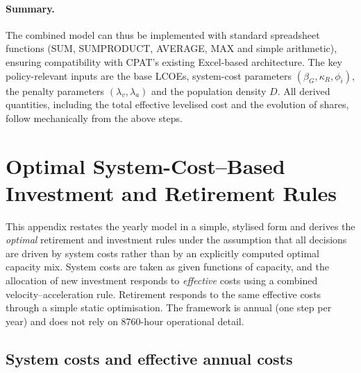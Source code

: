 \documentclass[preprint,authoryear,12pt]{elsarticle}
\begin{document}
\paragraph{Summary.}

The combined model can thus be implemented with standard spreadsheet functions (SUM,
SUMPRODUCT, AVERAGE, MAX and simple arithmetic), ensuring compatibility with CPAT’s
existing Excel-based architecture. The key policy-relevant inputs are the base LCOEs,
system-cost parameters $(\beta_G,\kappa_R,\phi_i)$, the penalty parameters $(\lambda_v,
\lambda_a)$ and the population density $D$. All derived quantities, including the total effective
levelised cost and the evolution of shares, follow mechanically from the above steps.


\newpage


\section{Optimal System-Cost–Based Investment and Retirement Rules}

This appendix restates the yearly model in a simple, stylised form and derives the \emph{optimal}
retirement and investment rules under the assumption that all decisions are driven by system
costs rather than by an explicitly computed optimal capacity mix. System costs are taken as
given functions of capacity, and the allocation of new investment responds to \emph{effective}
costs using a combined velocity–acceleration rule. Retirement responds to the same effective
costs through a simple static optimisation. The framework is annual (one step per year) and does
not rely on 8760-hour operational detail.

\subsection{System costs and effective annual costs}
\end{document}
